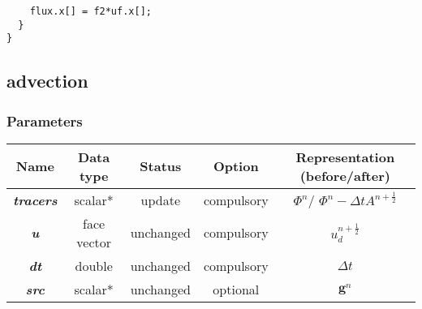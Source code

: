 \documentclass[a4paper]{article}
\newcommand{\func}[1]{\textbf{\textcolor{function}{#1}}}
\newcommand{\para}[1]{\textbf{\emph{\textcolor{para}{#1}}}}
\begin{document}
\begin{multicols}{2}
  \columnbreak
  \begin{verbatim}
    flux.x[] = f2*uf.x[];
  }
}
  \end{verbatim}
\end{multicols}

\subsection{\func{advection}}

\subsubsection{Parameters}
\begin{center}
  \begin{tabular}{|c|c|c|c|c|}
    \hline
    Name & Data type & Status & Option & Representation (before/after)\\[0.5ex]
    \hline\hline
    \rowcolor{output} \para{tracers} & scalar* & update & compulsory & $\Phi^n$/ $\Phi^n-\Delta t A^{n+ \frac{1}{2}}$\\
    \hline
    \para{u} & face vector & unchanged & compulsory & $u_d^{n+ \frac{1}{2}}$\\
    \hline
    \para{dt} & double & unchanged & compulsory & $\Delta t$\\
    \hline
    \para{src} & scalar* & unchanged & optional & $ \mathbf{g}^n$ \\
    \hline
  \end{tabular}
\end{center}
\end{document}
